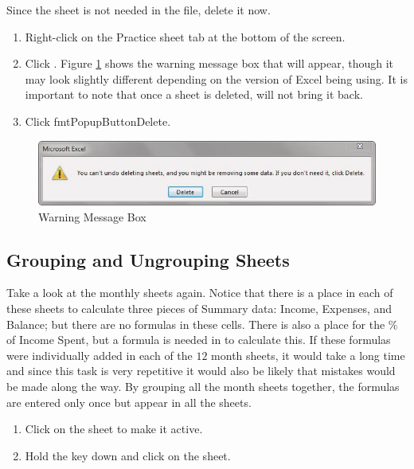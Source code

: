Since the  sheet is not needed in the  file, delete it now.

\begin{enumerate}
	\item Right-click on the Practice sheet tab at the bottom of the screen.
	\item Click . Figure \ref{06:fig03} shows the warning message box that will appear, though it may look slightly different depending on the version of Excel being using. It is important to note that once a sheet is deleted,  will not bring it back.
	\item Click fmtPopupButton{Delete}.
\end{enumerate}

\begin{figure}[H]
	\centering
	\includegraphics[width=\maxwidth{.95\linewidth}]{gfx/ch06_fig03}
	\caption{Warning Message Box}
	\label{06:fig03}
\end{figure}

\subsection{Grouping and Ungrouping Sheets}

Take a look at the monthly sheets again. Notice that there is a place in each of these sheets to calculate three pieces of Summary data: Income, Expenses, and Balance; but there are no formulas in these cells. There is also a place for the \% of Income Spent, but a formula is needed in  to calculate this. If these formulas were individually added in each of the $ 12 $ month sheets, it would take a long time and since this task is very repetitive it would also be likely that mistakes would be made along the way. By grouping all the month sheets together, the formulas are entered only once but appear in all the sheets.

\begin{enumerate}
	\item Click on the  sheet to make it active.
	\item Hold the  key down and click on the  sheet.
\end{enumerate}

